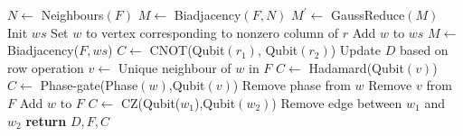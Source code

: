 \documentclass[a4paper,onecolumn,superscriptaddress,11pt,accepted=2020-04-27]{quantumarticle}
\theoremstyle{definition}
\begin{document}
\begin{algorithm}[!htb]
\begin{algorithmic}[1]
  \State $N\gets $ Neighbours$(F)$
  \State $M \gets$ Biadjacency$(F,N)$ %
  \State $M^\prime \gets $ GaussReduce$(M)$ %
  \State Init $ws$ 
      \State Set $w$ to vertex corresponding to nonzero column of $r$
      \State Add $w$ to $ws$ 
    \EndIf
  \EndFor
  \State $M \gets $  Biadjacency($F,ws$) 
    \State $C\gets $ CNOT(Qubit$(r_1)$, Qubit$(r_2)$)
    \State Update $D$ based on row operation
  \EndFor
   
    \State $v \gets $ Unique neighbour of $w$ in $F$
    \State $C\gets $ Hadamard(Qubit$(v)$)
    \State $C\gets $ Phase-gate(Phase$(w)$,Qubit$(v)$)
    \State Remove phase from $w$
    \State Remove $v$ from $F$
    \State Add $w$ to $F$
  \EndFor
    \State $C\gets $ CZ(Qubit($w_1$),Qubit$(w_2)$)
    \State Remove edge between $w_1$ and $w_2$
  \EndFor
  \State \textbf{return} $D,F,C$
\EndProcedure
\end{algorithmic}
\end{algorithm}
\end{document}
